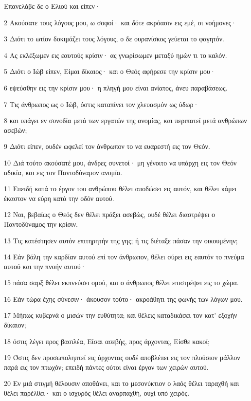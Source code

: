 \par Επανελάβε δε ο Ελιού και είπεν·
\par 2 Ακούσατε τους λόγους μου, ω σοφοί· και δότε ακρόασιν εις εμέ, οι νοήμονες·
\par 3 Διότι το ωτίον δοκιμάζει τους λόγους, ο δε ουρανίσκος γεύεται το φαγητόν.
\par 4 Ας εκλέξωμεν εις εαυτούς κρίσιν· ας γνωρίσωμεν μεταξύ ημών τι το καλόν.
\par 5 Διότι ο Ιώβ είπεν, Είμαι δίκαιος· και ο Θεός αφήρεσε την κρίσιν μου·
\par 6 εψεύσθην εις την κρίσιν μου· η πληγή μου είναι ανίατος, άνευ παραβάσεως.
\par 7 Τις άνθρωπος ως ο Ιώβ, όστις καταπίνει τον χλευασμόν ως ύδωρ·
\par 8 και υπάγει εν συνοδία μετά των εργατών της ανομίας, και περιπατεί μετά ανθρώπων ασεβών;
\par 9 Διότι είπεν, ουδέν ωφελεί τον άνθρωπον το να ευαρεστή εις τον Θεόν.
\par 10 Διά τούτο ακούσατέ μου, άνδρες συνετοί· μη γένοιτο να υπάρχη εις τον Θεόν αδικία, και εις τον Παντοδύναμον ανομία.
\par 11 Επειδή κατά το έργον του ανθρώπου θέλει αποδώσει εις αυτόν, και θέλει κάμει έκαστον να εύρη κατά την οδόν αυτού.
\par 12 Ναι, βεβαίως ο Θεός δεν θέλει πράξει ασεβώς, ουδέ θέλει διαστρέψει ο Παντοδύναμος την κρίσιν.
\par 13 Τις κατέστησεν αυτόν επιτηρητήν της γης; ή τις διέταξε πάσαν την οικουμένην;
\par 14 Εάν βάλη την καρδίαν αυτού επί τον άνθρωπον, θέλει σύρει εις εαυτόν το πνεύμα αυτού και την πνοήν αυτού·
\par 15 πάσα σαρξ θέλει εκπνεύσει ομού, και ο άνθρωπος θέλει επιστρέψει εις το χώμα.
\par 16 Εάν τώρα έχης σύνεσιν· άκουσον τούτο· ακροάθητι της φωνής των λόγων μου.
\par 17 Μήπως κυβερνά ο μισών την ευθύτητα; και θέλεις καταδικάσει τον κατ' εξοχήν δίκαιον;
\par 18 όστις λέγει προς βασιλέα, Είσαι ασεβής, προς άρχοντας, Είσθε κακοί;
\par 19 Όστις δεν προσωποληπτεί εις άρχοντας ουδέ αποβλέπει εις τον πλούσιον μάλλον παρά εις τον πτωχόν; επειδή πάντες ούτοι είναι έργον των χειρών αυτού.
\par 20 Εν μιά στιγμή θέλουσιν αποθάνει, και το μεσονύκτιον ο λαός θέλει ταραχθή και θέλει παρέλθει· και ο ισχυρός θέλει αναρπαχθή, ουχί υπό χειρός.
